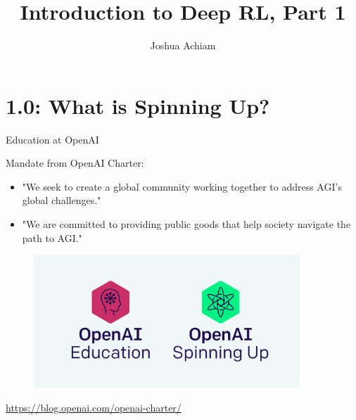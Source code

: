 \documentclass[9pt]{beamer}
\begin{document}


\title{Introduction to Deep RL, Part 1}
\author{Joshua Achiam}

\begin{frame}
\titlepage
\end{frame}


\section{1.0: What is Spinning Up?}

\begin{frame}{Education at OpenAI}

Mandate from OpenAI Charter: 
\begin{itemize}
\item "We seek to create a global community working together to address AGI’s global challenges."
\item "We are committed to providing public goods that help society navigate the path to AGI."
\end{itemize}
\begin{figure}
\centering
\includegraphics[height=5cm]{education_at_openai}
\end{figure}

\begin{center}
\url{https://blog.openai.com/openai-charter/}
\end{center}
\end{frame}
\end{document}

